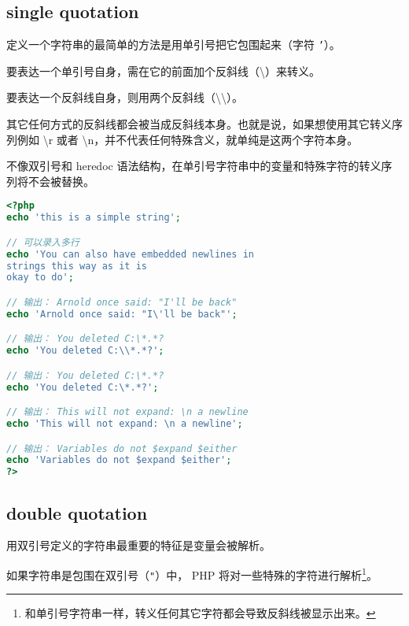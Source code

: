 \subsection{single quotation}

定义一个字符串的最简单的方法是用单引号把它包围起来（字符 \texttt{'}）。



\begin{compactitem}
\item 要表达一个单引号自身，需在它的前面加个反斜线（\textbackslash）来转义。
\item 要表达一个反斜线自身，则用两个反斜线（\textbackslash \textbackslash）。
\end{compactitem}

其它任何方式的反斜线都会被当成反斜线本身。也就是说，如果想使用其它转义序列例如 \textbackslash r 或者 \textbackslash n，并不代表任何特殊含义，就单纯是这两个字符本身。



不像双引号和 heredoc 语法结构，在单引号字符串中的变量和特殊字符的转义序列将不会被替换。

\begin{lstlisting}[language=PHP]
<?php
echo 'this is a simple string';

// 可以录入多行
echo 'You can also have embedded newlines in 
strings this way as it is
okay to do';

// 输出： Arnold once said: "I'll be back"
echo 'Arnold once said: "I\'ll be back"';

// 输出： You deleted C:\*.*?
echo 'You deleted C:\\*.*?';

// 输出： You deleted C:\*.*?
echo 'You deleted C:\*.*?';

// 输出： This will not expand: \n a newline
echo 'This will not expand: \n a newline';

// 输出： Variables do not $expand $either
echo 'Variables do not $expand $either';
?>
\end{lstlisting}


\subsection{double quotation}


用双引号定义的字符串最重要的特征是变量会被解析。

如果字符串是包围在双引号（\texttt{"}）中， PHP 将对一些特殊的字符进行解析\footnote{和单引号字符串一样，转义任何其它字符都会导致反斜线被显示出来。}。



